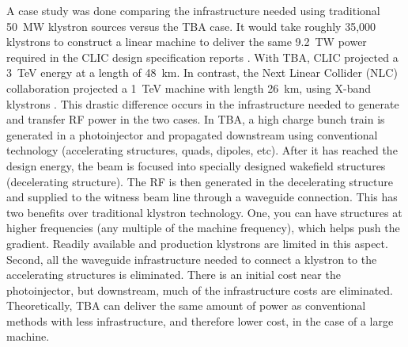 A case study was done comparing the infrastructure 
needed using traditional \SI{50}{MW} klystron sources versus the TBA case.
It would take roughly 35,000 klystrons to construct a linear machine to deliver the same 
\SI{9.2}{TW} power required in the CLIC design specification reports \cite{CLICdesignReport}. 
With TBA, CLIC projected a \SI{3}{TeV} energy at a length of \SI{48}{km}.
In contrast, the Next Linear Collider (NLC) collaboration projected a \SI{1}{TeV} machine 
with length \SI{26}{km}, using X-band klystrons \cite{NLC}. 
This drastic difference occurs in the infrastructure needed to generate and transfer
RF power in the two cases. In TBA, a high charge bunch train is generated in 
a photoinjector and propagated downstream using conventional technology 
(accelerating structures, quads, dipoles, etc). After it has reached the design energy, the beam
is focused into specially designed wakefield structures (decelerating structure).
The RF is then generated in the decelerating structure and supplied to the witness 
beam line through a waveguide connection. This has two benefits over traditional klystron technology.
One, you can have structures at higher frequencies (any multiple of the machine frequency), 
which helps push the gradient. Readily available and production klystrons are limited in this aspect.
Second, all the waveguide infrastructure needed to connect a klystron to the accelerating 
structures is eliminated. There is an initial cost near the photoinjector, 
but downstream, much of the infrastructure costs are eliminated.
Theoretically, TBA can deliver the same amount of power as conventional methods with less 
infrastructure, and therefore lower cost, in the case of a large machine. 

